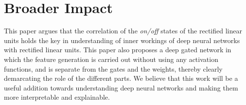 \section{Broader Impact}
This paper argues that the correlation of the \emph{on/off} states of the rectified linear units holds the key in understanding of inner workings of deep neural networks with rectified linear units. This paper also proposes a deep gated network in which the feature generation is carried out without using any activation functions, and is separate from the gates and the weights, thereby clearly demarcating the role of the different parts. We believe that this work will be a useful addition towards understanding deep neural networks and making them more interpretable and explainable. 